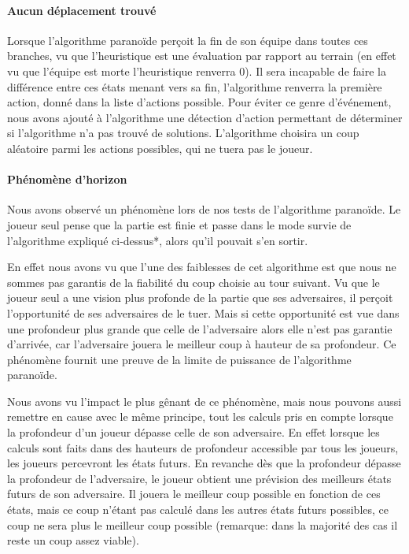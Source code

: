 	\paragraph{Aucun déplacement trouvé}
	Lorsque l'algorithme paranoïde perçoit la fin de son équipe dans    toutes ces branches, vu que l'heuristique est une évaluation par rapport au     terrain (en effet vu que l'équipe est morte l'heuristique renverra 0). Il    sera incapable de faire la différence entre ces états menant vers sa fin,     l'algorithme renverra la première action, donné dans la liste d'actions    possible. Pour éviter ce genre d'événement, nous avons ajouté à    l'algorithme une détection d'action permettant de déterminer si l'algorithme    n'a pas trouvé de solutions. L'algorithme choisira un coup aléatoire parmi les actions possibles, qui ne tuera pas le joueur.
	
	\paragraph{Phénomène d'horizon}
	Nous avons observé un phénomène lors de nos tests de l'algorithme
	paranoïde. Le joueur seul pense que la partie est finie et passe dans le
	mode survie de l'algorithme expliqué ci-dessus*, alors qu'il pouvait s'en sortir.
	
	En effet nous avons vu que l'une des faiblesses de cet algorithme 
	est que nous ne sommes pas garantis de la fiabilité du coup choisie au tour
	suivant. Vu que le joueur seul a une vision plus profonde de la partie que
	ses adversaires, il perçoit l'opportunité de ses adversaires de le tuer.
	Mais si cette opportunité est vue dans une profondeur plus grande que celle
	de l'adversaire alors elle n'est pas garantie d'arrivée, car l'adversaire
	jouera le meilleur coup à hauteur de sa profondeur. Ce phénomène fournit une
	preuve de la limite de puissance de l'algorithme paranoïde. 
	
	Nous avons vu l'impact le plus gênant de ce phénomène, mais nous
	pouvons aussi remettre en cause avec le même principe, tout les calculs pris
	en compte lorsque la profondeur d'un joueur dépasse celle de son adversaire.
	En effet lorsque les calculs sont faits dans des hauteurs de profondeur
	accessible par tous les joueurs, les joueurs percevront les états futurs.
	En revanche dès que la profondeur dépasse la profondeur de l'adversaire, le
	joueur obtient une prévision des meilleurs états futurs de son adversaire.
	Il jouera le meilleur coup possible en fonction de ces états, mais ce coup
	n'étant pas calculé dans les autres états futurs possibles, ce coup ne sera
	plus le meilleur coup possible (remarque: dans la majorité des cas il reste
	un coup assez viable).
	
